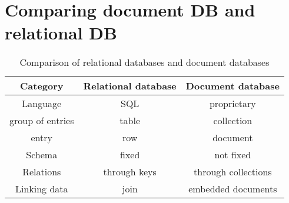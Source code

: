 
\section{Comparing document DB and relational DB}





\begin{table}[H]
    \centering
        \begin{tabular}{c|c|c}
            \textbf{Category} & \textbf{Relational database}    & \textbf{Document database} \\ \hline \hline
            Language          & SQL                             & proprietary                \\ \hline
            group of entries  & table                           & collection                 \\ \hline
            entry             & row                             & document                   \\ \hline
            Schema            & fixed                           & not fixed                  \\ \hline
            Relations         & through keys                    & through collections        \\ \hline
            Linking data      & join                            & embedded documents         \\ \hline
        \end{tabular}
    \caption{Comparison of relational databases and document databases}
    \label{tab:comparison}
\end{table}
\color{black}





